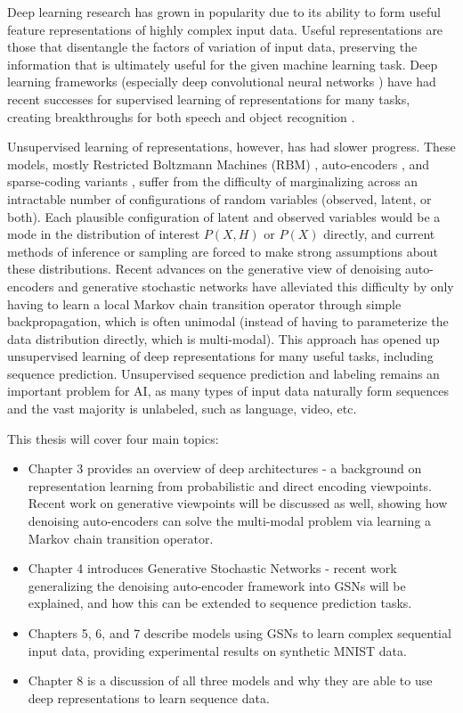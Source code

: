 Deep learning research has grown in popularity due to its ability to form useful feature representations of highly complex input data. Useful representations are those that disentangle the factors of variation of input data, preserving the information that is ultimately useful for the given machine learning task. Deep learning frameworks (especially deep convolutional neural networks \cite{lenet5}) have had recent successes for supervised learning of representations for many tasks, creating breakthroughs for both speech and object recognition \cite{seide11, krizhevsky12}.

Unsupervised learning of representations, however, has had slower progress. These models, mostly Restricted Boltzmann Machines (RBM) \cite{hinton06}, auto-encoders \cite{alain12}, and sparse-coding variants \cite{ranzato07}, suffer from the difficulty of marginalizing across an intractable number of configurations of random variables (observed, latent, or both). Each plausible configuration of latent and observed variables would be a mode in the distribution of interest \(P(X,H)\) or \(P(X)\) directly, and current methods of inference or sampling are forced to make strong assumptions about these distributions. Recent advances on the generative view of denoising auto-encoders and generative stochastic networks \cite{gsn} have alleviated this difficulty by only having to learn a local Markov chain transition operator through simple backpropagation, which is often unimodal (instead of having to parameterize the data distribution directly, which is multi-modal). This approach has opened up unsupervised learning of deep representations for many useful tasks, including sequence prediction. Unsupervised sequence prediction and labeling remains an important problem for AI, as many types of input data naturally form sequences and the vast majority is unlabeled, such as language, video, etc.

This thesis will cover four main topics:
\begin{itemize}
	\item Chapter 3 provides an overview of deep architectures - a background on representation learning from probabilistic and direct encoding viewpoints. Recent work on generative viewpoints will be discussed as well, showing how denoising auto-encoders can solve the multi-modal problem via learning a Markov chain transition operator.
	\item Chapter 4 introduces Generative Stochastic Networks - recent work generalizing the denoising auto-encoder framework into GSNs will be explained, and how this can be extended to sequence prediction tasks.
	\item Chapters 5, 6, and 7 describe models using GSNs to learn complex sequential input data, providing experimental results on synthetic MNIST data.
	\item Chapter 8 is a discussion of all three models and why they are able to use deep representations to learn sequence data.
\end{itemize}